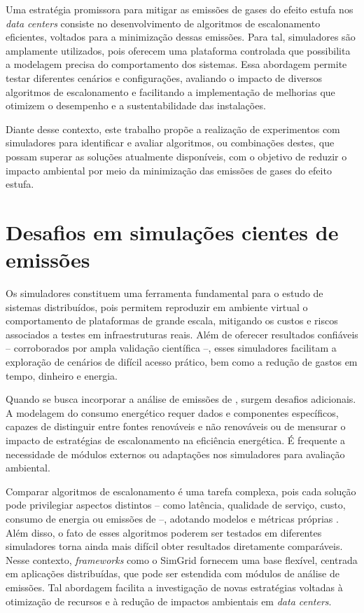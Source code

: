 \documentclass[12pt]{article}
\begin{document}
Uma estratégia promissora para mitigar as emissões de gases do efeito estufa nos \textit{data centers} consiste no desenvolvimento de algoritmos de escalonamento eficientes, voltados para a minimização dessas emissões. Para tal, simuladores são amplamente utilizados, pois oferecem uma plataforma controlada que possibilita a modelagem precisa do comportamento dos sistemas. Essa abordagem permite testar diferentes cenários e configurações, avaliando o impacto de diversos algoritmos de escalonamento e facilitando a implementação de melhorias que otimizem o desempenho e a sustentabilidade das instalações.

Diante desse contexto, este trabalho propõe a realização de experimentos com simuladores para identificar e avaliar algoritmos, ou combinações destes, que possam superar as soluções atualmente disponíveis, com o objetivo de reduzir o impacto ambiental por meio da minimização das emissões de gases do efeito estufa.

\section{Desafios em simulações cientes de emissões} \label{sec:firstpage}

Os simuladores constituem uma ferramenta fundamental para o estudo de sistemas distribuídos, pois permitem reproduzir em ambiente virtual o comportamento de plataformas de grande escala, mitigando os custos e riscos associados a testes em infraestruturas reais. Além de oferecer resultados confiáveis -- corroborados por ampla validação científica --, esses simuladores facilitam a exploração de cenários de difícil acesso prático, bem como a redução de gastos em tempo, dinheiro e energia.

Quando se busca incorporar a análise de emissões de , surgem desafios adicionais. A modelagem do consumo energético requer dados e componentes específicos, capazes de distinguir entre fontes renováveis e não renováveis ou de mensurar o impacto de estratégias de escalonamento na eficiência energética. É frequente a necessidade de módulos externos ou adaptações nos simuladores para avaliação ambiental.

Comparar algoritmos de escalonamento é uma tarefa complexa, pois cada solução pode privilegiar aspectos distintos -- como latência, qualidade de serviço, custo, consumo de energia ou emissões de  --, adotando modelos e métricas próprias \cite{kumar:19}. Além disso, o fato de esses algoritmos poderem ser testados em diferentes simuladores torna ainda mais difícil obter resultados diretamente comparáveis. Nesse contexto, \textit{frameworks} como o SimGrid \cite{casanova:14} fornecem uma base flexível, centrada em aplicações distribuídas, que pode ser estendida com módulos de análise de emissões. Tal abordagem facilita a investigação de novas estratégias voltadas à otimização de recursos e à redução de impactos ambientais em \textit{data centers}.
\end{document}
